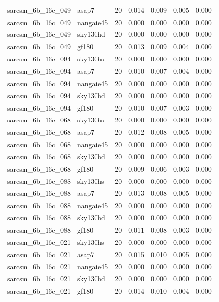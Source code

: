 \begin{tabular}{llrrrrr}
sarcsm\_6b\_16c\_049 & asap7 & 20 & 0.014 & 0.009 & 0.005 & 0.000 \\
sarcsm\_6b\_16c\_049 & nangate45 & 20 & 0.000 & 0.000 & 0.000 & 0.000 \\
sarcsm\_6b\_16c\_049 & sky130hd & 20 & 0.000 & 0.000 & 0.000 & 0.000 \\
sarcsm\_6b\_16c\_049 & gf180 & 20 & 0.013 & 0.009 & 0.004 & 0.000 \\
sarcsm\_6b\_16c\_094 & sky130hs & 20 & 0.000 & 0.000 & 0.000 & 0.000 \\
sarcsm\_6b\_16c\_094 & asap7 & 20 & 0.010 & 0.007 & 0.004 & 0.000 \\
sarcsm\_6b\_16c\_094 & nangate45 & 20 & 0.000 & 0.000 & 0.000 & 0.000 \\
sarcsm\_6b\_16c\_094 & sky130hd & 20 & 0.000 & 0.000 & 0.000 & 0.000 \\
sarcsm\_6b\_16c\_094 & gf180 & 20 & 0.010 & 0.007 & 0.003 & 0.000 \\
sarcsm\_6b\_16c\_068 & sky130hs & 20 & 0.000 & 0.000 & 0.000 & 0.000 \\
sarcsm\_6b\_16c\_068 & asap7 & 20 & 0.012 & 0.008 & 0.005 & 0.000 \\
sarcsm\_6b\_16c\_068 & nangate45 & 20 & 0.000 & 0.000 & 0.000 & 0.000 \\
sarcsm\_6b\_16c\_068 & sky130hd & 20 & 0.000 & 0.000 & 0.000 & 0.000 \\
sarcsm\_6b\_16c\_068 & gf180 & 20 & 0.009 & 0.006 & 0.003 & 0.000 \\
sarcsm\_6b\_16c\_088 & sky130hs & 20 & 0.000 & 0.000 & 0.000 & 0.000 \\
sarcsm\_6b\_16c\_088 & asap7 & 20 & 0.013 & 0.008 & 0.005 & 0.000 \\
sarcsm\_6b\_16c\_088 & nangate45 & 20 & 0.000 & 0.000 & 0.000 & 0.000 \\
sarcsm\_6b\_16c\_088 & sky130hd & 20 & 0.000 & 0.000 & 0.000 & 0.000 \\
sarcsm\_6b\_16c\_088 & gf180 & 20 & 0.011 & 0.008 & 0.003 & 0.000 \\
sarcsm\_6b\_16c\_021 & sky130hs & 20 & 0.000 & 0.000 & 0.000 & 0.000 \\
sarcsm\_6b\_16c\_021 & asap7 & 20 & 0.015 & 0.010 & 0.005 & 0.000 \\
sarcsm\_6b\_16c\_021 & nangate45 & 20 & 0.000 & 0.000 & 0.000 & 0.000 \\
sarcsm\_6b\_16c\_021 & sky130hd & 20 & 0.000 & 0.000 & 0.000 & 0.000 \\
sarcsm\_6b\_16c\_021 & gf180 & 20 & 0.014 & 0.010 & 0.004 & 0.000 \\

\end{tabular}
